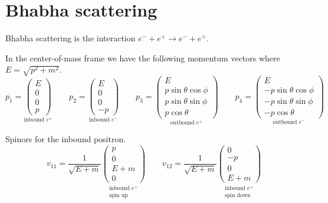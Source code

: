 

\section*{Bhabha scattering}
Bhabha scattering is the interaction $e^-+e^+\rightarrow e^-+e^+$.

\begin{center}
\end{center}

In the center-of-mass frame we have the following momentum vectors where $E=\sqrt{p^2+m^2}$.
\begin{equation*}
p_1=\underset{\text{inbound $e^+$}}
{\begin{pmatrix}E\\0\\0\\p\end{pmatrix}}
\qquad
p_2=\underset{\text{inbound $e^-$}}
{\begin{pmatrix}E\\0\\0\\-p\end{pmatrix}}
\qquad
p_3=\underset{\text{outbound $e^+$}}
{\begin{pmatrix}E\\p\sin\theta\cos\phi\\p\sin\theta\sin\phi\\p\cos\theta\end{pmatrix}}
\qquad
p_4=\underset{\text{outbound $e^-$}}
{\begin{pmatrix}E\\-p\sin\theta\cos\phi\\-p\sin\theta\sin\phi\\-p\cos\theta\end{pmatrix}}
\end{equation*}

Spinors for the inbound positron.
\begin{equation*}
v_{11}=\frac{1}{\sqrt{E+m}}
\underset{\substack{\text{inbound $e^+$}\\\text{spin up}}}
{\begin{pmatrix}p\\0\\E+m\\0\end{pmatrix}}
\qquad
v_{12}=\frac{1}{\sqrt{E+m}}
\underset{\substack{\text{inbound $e^+$}\\\text{spin down}}}
{\begin{pmatrix}0\\-p\\0\\E+m\end{pmatrix}}
\end{equation*}

